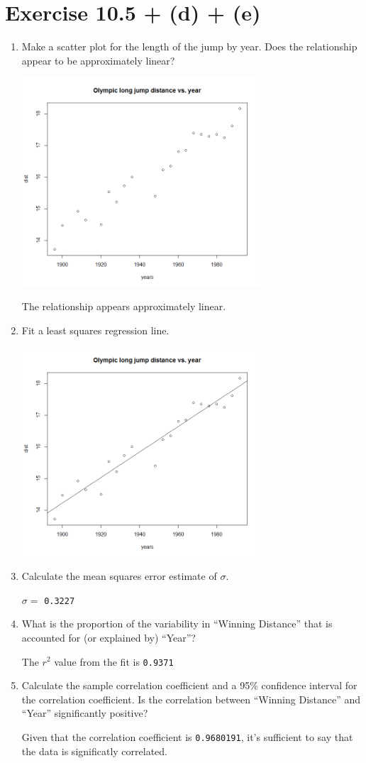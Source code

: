 \documentclass{article}
\begin{document}
\section*{Exercise 10.5 + (d) + (e)}

\begin{enumerate}[\quad(a)]
	\item Make a scatter plot for the length of the jump by year. Does the relationship appear to be approximately linear?\\
	\begin{center}
		\includegraphics[width=3.5in]{Q31.png}
	\end{center}
	The relationship appears approximately linear.
	\item Fit a least squares regression line.\\
	\begin{center}
		\includegraphics[width=3.5in]{Q32.png}
	\end{center}
	\item Calculate the mean squares error estimate of $\sigma$.

	$\sigma =$ \texttt{0.3227}
	\item What is the proportion of the variability in ``Winning Distance'' that is accounted for (or explained by) ``Year''?

	The $r^2$ value from the fit is \texttt{0.9371}
	\item Calculate the sample correlation coefficient and a 95\% confidence interval for the correlation coefficient. Is the correlation between ``Winning Distance'' and ``Year'' significantly positive?

	Given that the correlation coefficient is \texttt{0.9680191}, it's sufficient to say that the data is significatly correlated.
\end{enumerate}
\end{document}
